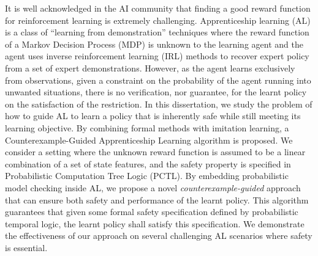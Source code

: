 It is well acknowledged in the AI community that finding a good reward function for reinforcement learning is extremely challenging. Apprenticeship learning (AL) is a class of ``learning from demonstration'' techniques where the reward function of a Markov Decision Process (MDP) is unknown to the learning agent and the agent uses inverse reinforcement learning (IRL) methods to recover expert policy from a set of expert demonstrations. However, as the agent learns exclusively from observations, given a constraint on the probability of the agent running into unwanted situations, there is no verification, nor guarantee, for the learnt policy on the satisfaction of the restriction. In this dissertation, we study the problem of how to guide AL to learn a policy that is inherently safe while still meeting its learning objective. By combining formal methods with imitation learning, a Counterexample-Guided Apprenticeship Learning algorithm is proposed. We consider a setting where the unknown reward function is assumed to be a linear combination of a set of state features, and the safety property is specified in Probabilistic Computation Tree Logic (PCTL). By embedding probabilistic model checking inside AL, we propose a novel {\it counterexample-guided} approach that can ensure both safety and performance of the learnt policy. This algorithm guarantees that given some formal safety specification defined by probabilistic temporal logic, the learnt policy shall satisfy this specification. We demonstrate the effectiveness of our approach on several challenging AL scenarios where safety is essential.